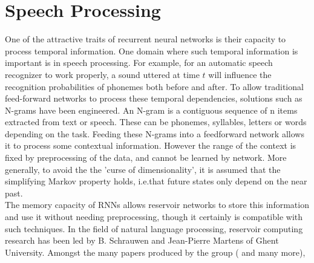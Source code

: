 \documentclass[12pt,oneside]{CUNY_CS_PhD}
\begin{document}

\section{Speech Processing}
One of the attractive traits of recurrent neural networks is their capacity to process temporal information. One domain where such temporal information is important is in speech processing. For example, for an automatic speech recognizer to work properly, a sound uttered at time $t$ will influence the recognition probabilities of phonemes both before and after. To allow traditional feed-forward networks to process these temporal dependencies, solutions such as 
N-grams have been engineered. An N-gram is a contiguous sequence of n items extracted from text or speech. These can be phonemes, syllables, letters or words depending on the task. Feeding these N-grams into a feedforward network allows it to process some contextual information. However the range of the context is fixed by preprocessing of the data, and cannot be learned by network. More generally, to avoid the the 'curse of dimensionality', it is assumed that the simplifying Markov property holds, i.e.that future states only depend on the near past.\\
The memory capacity of RNNs allows reservoir networks to store this information and use it without needing preprocessing, though it certainly is compatible with such techniques. In the field of natural language processing, reservoir computing research has been led by B. Schrauwen and Jean-Pierre Martens of Ghent University. Amongst the many papers produced by the group (\cite{verstraeten_isolated_2005, jalalvand_connected_2011} and many more), 
\end{document}
